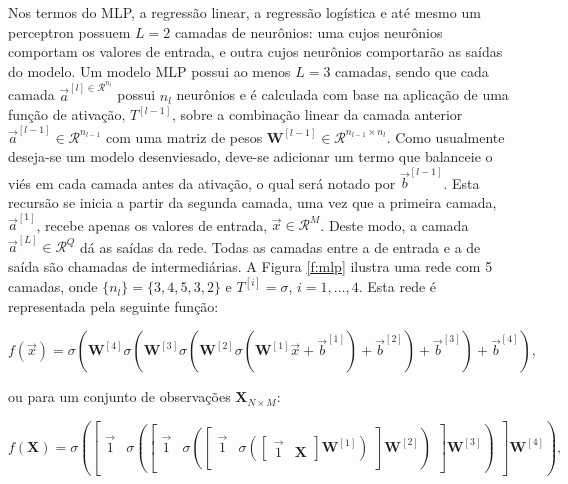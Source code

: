     Nos termos do MLP, a regressão linear, a regressão logística e até mesmo um perceptron possuem $L=2$ camadas de neurônios: uma cujos neurônios comportam os valores de entrada, e outra cujos neurônios comportarão as saídas do modelo. Um modelo MLP possui ao menos $L=3$ camadas, sendo que cada camada $\vec{a}^{[l] \in \mathcal{R}^{n_l}}$ possui $n_l$ neurônios e é calculada com base na aplicação de uma função de ativação, $T^{[l-1]}$, sobre a combinação linear da camada anterior $\vec{a}^{[l-1]} \in \mathcal{R}^{n_{l-1}}$ com uma matriz de pesos $\boldsymbol{W}^{[l-1]} \in \mathcal{R}^{n_{l-1}\times n_l}$. Como usualmente deseja-se um modelo desenviesado, deve-se adicionar um termo que balanceie o viés em cada camada antes da ativação, o qual será notado por $\vec{b}^{[l-1]}$. Esta recursão se inicia a partir da segunda camada, uma vez que a primeira camada, $\vec{a}^{[1]}$, recebe apenas os valores de entrada, $\vec{x} \in \mathcal{R}^{M}$. Deste modo, a camada $\vec{a}^{[L]} \in \mathcal{R}^{Q}$ dá as saídas da rede. Todas as camadas entre a de entrada e a de saída são chamadas de intermediárias. A Figura \ref{f:mlp} ilustra uma rede com 5 camadas, onde $\{n_l\} = \{3,4,5,3,2\}$ e $T^{[i]}=\sigma$, $i=1,\ldots,4$. Esta rede é representada pela seguinte função:

    \begin{equation} \label{e:mlp_exemplo}
      f(\vec{x}) =
      \sigma(
        \boldsymbol{W}^{[4]} \sigma(
          \boldsymbol{W}^{[3]} \sigma(
            \boldsymbol{W}^{[2]} \sigma(
              \boldsymbol{W}^{[1]}
                \vec{x}
              + {\vec{b}^{[1]}})
            + {\vec{b}^{[2]}})
          + {\vec{b}^{[3]}})
        + {\vec{b}^{[4]}})
      ,
    \end{equation}

    \noindent ou para um conjunto de observações $\boldsymbol{X}_{N\times M}$:

    \begin{equation} \label{e:mlp_exemplo_muitas_obs}
      f(\boldsymbol{X}) =
      \sigma\left(
        \begin{bmatrix} \vec{1} & \sigma\left(
          \begin{bmatrix} \vec{1} & \sigma\left(
            \begin{bmatrix} \vec{1} & \sigma\left(
              \begin{bmatrix} \vec{1} & \boldsymbol{X} \end{bmatrix}
            \boldsymbol{W}^{[1]}\right) \end{bmatrix}
          \boldsymbol{W}^{[2]}\right) \end{bmatrix}
        \boldsymbol{W}^{[3]}\right) \end{bmatrix}
      \boldsymbol{W}^{[4]}\right)
      ,
    \end{equation}

